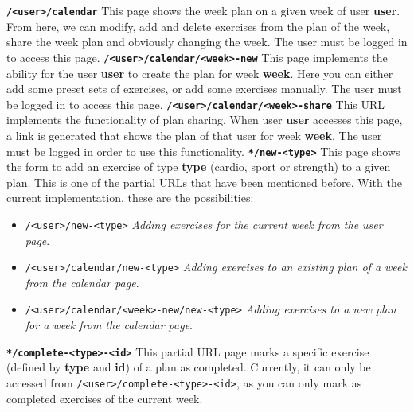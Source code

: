\documentclass[12pt,twoside,titlepage,a4paper]{article}
\theoremstyle{definicion}
\theoremstyle{lema}
\theoremstyle{teorema}
\theoremstyle{corolario}
\theoremstyle{ejemplo}
\theoremstyle{nota}
\begin{document}
\texttt{\textbf{/<user>/calendar}}
\newline\newline
This page shows the week plan on a given week of user \textbf{user}. From here, we can modify, add and delete exercises
from the plan of the week, share the week plan and obviously changing the week. The user must be logged in to access
this page.
\newline\newline
\texttt{\textbf{/<user>/calendar/<week>-new}}
\newline\newline
This page implements the ability for the user \textbf{user} to create the plan for week \textbf{week}. Here you can either
add some preset sets of exercises, or add some exercises manually. The user must be logged in to access this page.
\newline\newline
\texttt{\textbf{/<user>/calendar/<week>-share}}
\newline\newline
This URL implements the functionality of plan sharing. When user \textbf{user} accesses this page, a link is generated that
shows the plan of that user for week \textbf{week}. The user must be logged in order to use this functionality.
\newpage
\texttt{\textbf{*/new-<type>}}
\newline\newline
This page shows the form to add an exercise of type \textbf{type} (cardio, sport or strength) to a given plan. This is one
of the partial URLs that have been mentioned before. With the current implementation, these are the possibilities:
\begin{itemize} [noitemsep]
	\item \texttt{/<user>/new-<type>} \textit{Adding exercises for the current week from the user page}.
	\item \texttt{/<user>/calendar/new-<type>} \textit{Adding exercises to an existing plan of a week from the calendar page}.
	\item \texttt{/<user>/calendar/<week>-new/new-<type>} \textit{Adding exercises to a new plan for a week from the calendar page}.
\end{itemize}
\texttt{\textbf{*/complete-<type>-<id>}}
\newline\newline
This partial URL page marks a specific exercise (defined by \textbf{type} and \textbf{id}) of a plan as completed. Currently, it can
only be accessed from \texttt{/<user>/complete-<type>-<id>}, as you can only mark as completed exercises of the current week.
\end{document}
